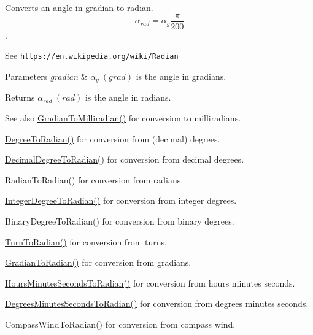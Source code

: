 Converts an angle in gradian to radian. \[\alpha_{rad}=\alpha_{g}\frac{\pi}{200}\]. 

See \href{https://en.wikipedia.org/wiki/Radian}{\tt https\+://en.\+wikipedia.\+org/wiki/\+Radian} 
\begin{DoxyParams}{Parameters}
{\em gradian} & $\alpha_{g}\ (grad)$ is the angle in gradians. \\
\hline
\end{DoxyParams}
\begin{DoxyReturn}{Returns}
$\alpha_{rad}\ (rad)$ is the angle in radians. 
\end{DoxyReturn}
\begin{DoxySeeAlso}{See also}
\mbox{\hyperlink{group___e_g_x_math-_angle_conversions-_gradian_ga144f1019dc760268a163d81fcb3ce482}{Gradian\+To\+Milliradian()}} for conversion to milliradians. 

\mbox{\hyperlink{group___e_g_x_math-_angle_conversions-_degree_ga48585541b228c852c9d08a9eac3682f0}{Degree\+To\+Radian()}} for conversion from (decimal) degrees. 

\mbox{\hyperlink{group___e_g_x_math-_angle_conversions-_decimal_degree_ga906ee2c83cdf4caa59eb613dc2d5d52a}{Decimal\+Degree\+To\+Radian()}} for conversion from decimal degrees. 

Radian\+To\+Radian() for conversion from radians. 

\mbox{\hyperlink{group___e_g_x_math-_angle_conversions-_integer_degree_ga05d3368b00ea27b9895de2ffe5c8df38}{Integer\+Degree\+To\+Radian()}} for conversion from integer degrees. 

Binary\+Degree\+To\+Radian() for conversion from binary degrees. 

\mbox{\hyperlink{group___e_g_x_math-_angle_conversions-_turn_ga72e6d3c46ebfc25f7be5050136d8df16}{Turn\+To\+Radian()}} for conversion from turns. 

\mbox{\hyperlink{group___e_g_x_math-_angle_conversions-_gradian_ga7ea0a6f47a672715b960181606c8fd7b}{Gradian\+To\+Radian()}} for conversion from gradians. 

\mbox{\hyperlink{group___e_g_x_math-_angle_conversions-_hours_minutes_seconds_gaa0b04e9012ec739df1464298971e3be7}{Hours\+Minutes\+Seconds\+To\+Radian()}} for conversion from hours minutes seconds. 

\mbox{\hyperlink{group___e_g_x_math-_angle_conversions-_degrees_minutes_seconds_ga6c99d7a2a1646b3d9c8d40cd7f083aa4}{Degrees\+Minutes\+Seconds\+To\+Radian()}} for conversion from degrees minutes seconds. 

Compass\+Wind\+To\+Radian() for conversion from compass wind. 
\end{DoxySeeAlso}
\mbox{\label{group___e_g_x_math-_angle_conversions-_gradian_ga11b42138910d26474f47c0a2043911c9}} 
